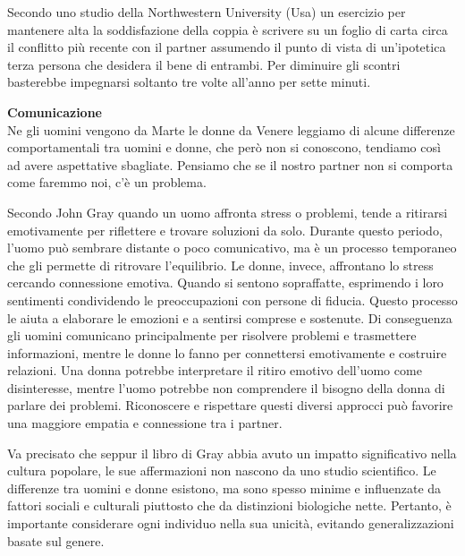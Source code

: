 \documentclass[12pt]{book} %
\begin{document}
\begin{mdframed}[linewidth=1pt]
Secondo uno studio della Northwestern University (Usa) un esercizio per mantenere alta la soddisfazione della coppia è
scrivere su un foglio di carta circa il conflitto più recente con il partner assumendo il punto di vista di
un'ipotetica terza persona che desidera il bene di entrambi. Per diminuire gli scontri basterebbe impegnarsi soltanto
tre volte all'anno per sette
minuti.
\end{mdframed}

\noindent \textbf{\large Comunicazione} \\
Ne gli uomini vengono da Marte le donne da
Venere leggiamo di alcune
differenze comportamentali tra uomini e donne, che però non si conoscono, tendiamo così ad avere aspettative sbagliate.
Pensiamo che se il nostro partner non si comporta come faremmo noi, c'è un problema. 

Secondo John Gray quando un uomo affronta stress o problemi, tende a ritirarsi emotivamente per riflettere e trovare soluzioni da solo. Durante questo periodo, l'uomo può sembrare distante o poco comunicativo, ma è un processo temporaneo che gli permette di ritrovare l'equilibrio. Le donne, invece, affrontano lo stress cercando connessione emotiva. Quando si sentono sopraffatte, esprimendo i loro sentimenti condividendo le preoccupazioni con persone di fiducia. Questo processo le aiuta a elaborare le emozioni e a sentirsi comprese e sostenute.
Di conseguenza gli uomini comunicano principalmente per risolvere problemi e trasmettere informazioni, mentre le donne lo fanno per connettersi emotivamente e costruire relazioni.
Una donna potrebbe interpretare il ritiro emotivo dell'uomo come disinteresse, mentre l'uomo potrebbe non comprendere il bisogno della donna di parlare dei problemi. Riconoscere e rispettare questi diversi approcci può favorire una maggiore empatia e connessione tra i partner.

Va precisato che seppur il libro di Gray abbia avuto un impatto significativo nella cultura popolare, le sue affermazioni non nascono da uno studio scientifico. Le differenze tra uomini e donne esistono, ma sono spesso minime e influenzate da fattori sociali e culturali piuttosto che da distinzioni biologiche nette. Pertanto, è importante considerare ogni individuo nella sua unicità, evitando generalizzazioni basate sul genere.
\end{document}
